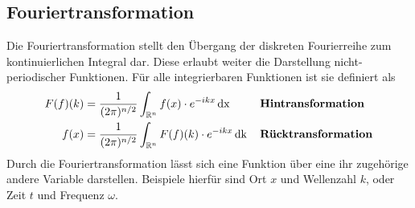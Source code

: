         \subsection*{Fouriertransformation}
Die Fouriertransformation stellt den Übergang der diskreten Fourierreihe zum
kontinuierlichen Integral dar. Diese erlaubt weiter die Darstellung nicht-periodischer
Funktionen. Für alle integrierbaren Funktionen ist sie definiert als
                \begin{align*}
                   F(f)(k) &= \frac{1}{(2\pi)^{n/2}} \int_{\mathbb{R}^n}
                    f(x) \cdot e^{-ikx} \,\text{dx}\, & &\text{\textbf{Hintransformation}}\\
                    f(x) &= \frac{1}{(2\pi)^{n/2}} \int_{\mathbb{R}^n}
                    F(f)(k) \cdot e^{-ikx} \,\text{dk}\, & &\text{\textbf{Rücktransformation}}
                \end{align*}
Durch die Fouriertransformation lässt sich eine Funktion über eine ihr zugehörige
andere Variable darstellen. Beispiele hierfür sind Ort $x$ und Wellenzahl $k$,
oder Zeit $t$ und Frequenz $\omega$.